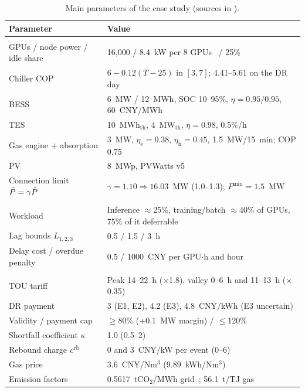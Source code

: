 \begin{table}[!t]
\caption{Main parameters of the case study (sources in ).}
\label{tab:params}
\centering\footnotesize
\begin{tabularx}{\columnwidth}{@{}>{\raggedright\arraybackslash}p{}X@{}}
\toprule
Parameter & Value\\
\midrule
\multicolumn{2}{@{}l}{\textit{Equipment}}\\
GPUs / node power / idle share & 16,000 / 8.4~kW per 8 GPUs~\cite{latif2024} / 25\%\\
Chiller COP & $6-0.12(T-25)$ in $[3,7]$; 4.41--5.61 on the DR day\\
BESS & 6~MW / 12~MWh, SOC 10--95\%, $\eta=0.95/0.95$, 60~CNY/MWh~\cite{xu2018}\\
TES & 10~MWh$_{\mathrm{th}}$, 4~MW$_{\mathrm{th}}$, $\eta=0.98$, 0.5\%/h\\
Gas engine + absorption & 3~MW, $\eta_{\mathrm e}=0.38$, $\eta_{\mathrm h}=0.45$, 1.5~MW/15~min; COP 0.75\\
PV & 8~MWp, PVWatts v5~\cite{dobos2014}\\
Connection limit $\bar P=\gamma\hat P$ & $\gamma=1.10\Rightarrow16.03$~MW (1.0--1.3); $P^{\min}=1.5$~MW\\
\multicolumn{2}{@{}l}{\textit{Computing}}\\
Workload & Inference $\approx$25\%, training/batch $\approx$40\% of GPUs, 75\% of it deferrable\\
Lag bounds $L_{1,2,3}$ & 0.5 / 1.5 / 3~h\\
Delay cost / overdue penalty & 0.5 / 1000~CNY per GPU$\cdot$h and hour\\
\multicolumn{2}{@{}l}{\textit{Market and policy}}\\
TOU tariff & Peak 14--22~h ($\times$1.8), valley 0--6~h and 11--13~h ($\times$0.35)\\
DR payment & 3 (E1, E2), 4.2 (E3), 4.8~CNY/kWh (E3 uncertain)\\
Validity / payment cap & $\ge$80\% (+0.1~MW margin) / $\le$120\%\\
Shortfall coefficient $\kappa$ & 1.0 (0.5--2)\\
Rebound charge $c^{\mathrm{rb}}$ & 0 and 3~CNY/kW per event (0--6)\\
Gas price & 3.6~CNY/Nm$^3$ (9.89~kWh/Nm$^3$)\\
Emission factors & 0.5617~tCO$_2$/MWh grid~\cite{mee2024ef}; 56.1~t/TJ gas\\
\bottomrule
\end{tabularx}
\end{table}

